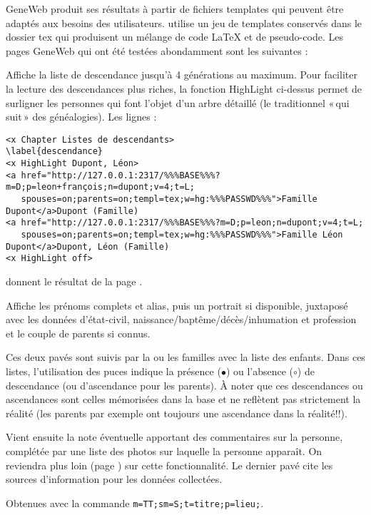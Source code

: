 GeneWeb produit ses résultats à partir de fichiers templates qui peuvent être
adaptés aux besoins des utilisateurs.
\gwtol{} utilise un jeu de templates conservés dans le dossier tex qui
produisent un mélange de code \LaTeX{} et de pseudo-code.
Les pages GeneWeb qui ont été testées abondamment sont les suivantes :

\begin{description}[style=nextline]
\item[Liste de descendance] Affiche la liste de descendance jusqu'à 4
générations au maximum. Pour faciliter la lecture des descendances plus riches,
la fonction HighLight ci-dessus permet de surligner les personnes
qui font l'objet d'un arbre détaillé (le traditionnel «\,qui suit\,» des généalogies).
Les lignes :
\begin{verbatim}
<x Chapter Listes de descendants>
\label{descendance}
<x HighLight Dupont, Léon>
<a href="http://127.0.0.1:2317/%%%BASE%%%?m=D;p=leon+françois;n=dupont;v=4;t=L;
   spouses=on;parents=on;templ=tex;w=hg:%%%PASSWD%%%">Famille Dupont</a>Dupont (Famille)
<a href="http://127.0.0.1:2317/%%%BASE%%%?m=D;p=leon;n=dupont;v=4;t=L;
   spouses=on;parents=on;templ=tex;w=hg:%%%PASSWD%%%">Famille Léon Dupont</a>Dupont, Léon (Famille)
<x HighLight off>
\end{verbatim}
donnent le résultat de la page \pageref{descendance}.

\item[Page perso] Affiche les prénoms complets et alias, puis
un portrait si disponible, juxtaposé avec les
données d'état-civil, naissance/baptême/décès/inhumation et profession
et le couple de parents si connus.

Ces deux pavés sont suivis par la ou les familles avec la liste des enfants.
Dans ces listes, l'utilisation des puces indique la présence ($\bullet$)
ou l'absence ($\circ$) de descendance (ou d'ascendance pour les parents).
À noter que ces descendances ou ascendances sont celles mémorisées dans la base
et ne reflètent pas strictement la réalité (les parents par exemple ont toujours
une ascendance dans la réalité!!).

Vient ensuite la note éventuelle apportant des commentaires sur la personne,
complétée par une liste des photos sur laquelle la personne apparaît.
On reviendra plus loin (page \pageref{images}) sur cette fonctionnalité.
Le dernier pavé cite les sources d'information pour les données collectées.


\item[Liste par titre] Obtenues avec la commande
\verb|m=TT;sm=S;t=titre;p=lieu;|.


\end{description}
